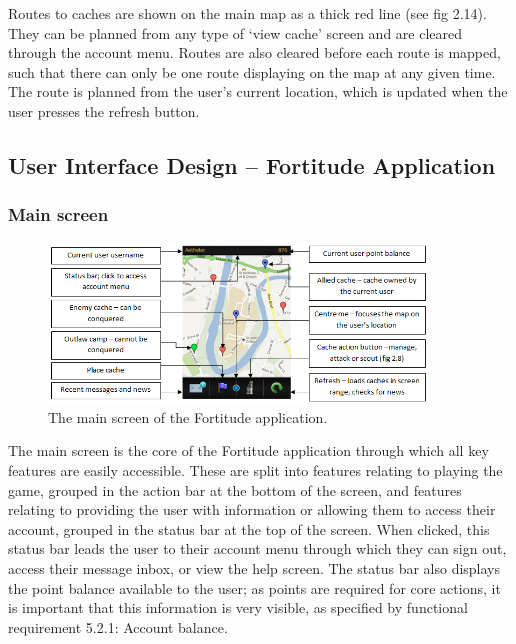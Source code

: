 Routes to caches are shown on the main map as a thick red line (see fig 2.14). They can be planned from any type of ‘view cache’ screen and are cleared through the account menu. Routes are also cleared before each route is mapped, such that there can only be one route displaying on the map at any given time. The route is planned from the user's current location, which is updated when the user presses the refresh button.
\vspace{30pt}

\subsection{User Interface Design – Fortitude Application}

\subsubsection{Main screen}

\begin{figure}[ht]
	\begin{center}
	\includegraphics[width=0.9\textwidth]{images/main_screen}
	\caption{The main screen of the Fortitude application.}
	\label{main_screen}
	\end{center}
\end{figure}

The main screen is the core of the Fortitude application through which all key features are easily accessible. These are split into features relating to playing the game, grouped in the action bar at the bottom of the screen, and features relating to providing the user with information or allowing them to access their account, grouped in the status bar at the top of the screen. When clicked, this status bar leads the user to their account menu through which they can sign out, access their message inbox, or view the help screen. The status bar also displays the point balance available to the user; as points are required for core actions, it is important that this information is very visible, as specified by functional requirement 5.2.1: Account balance.

